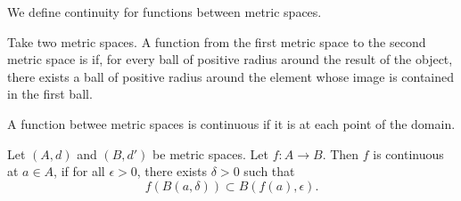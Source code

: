 
\sbasic



\sstart



We define continuity for
functions between metric
spaces.



Take two metric spaces.
A function from the
first metric space to the
second metric space is
if, for every ball of positive
radius around the result of the object,
there exists a ball
of positive radius
around the element
whose image is contained
in the first ball.

A function betwee metric
spaces is continuous if it is
at each point of the domain.


Let $(A, d)$ and $(B, d')$
be metric spaces.
Let $f: A \to B$.
Then $f$ is continuous at $a \in A$,
if for all $\epsilon > 0$,
there exists $\delta > 0$
such that
\[
  f(B(a, \delta)) \subset B(f(a), \epsilon).
\]

\strats

